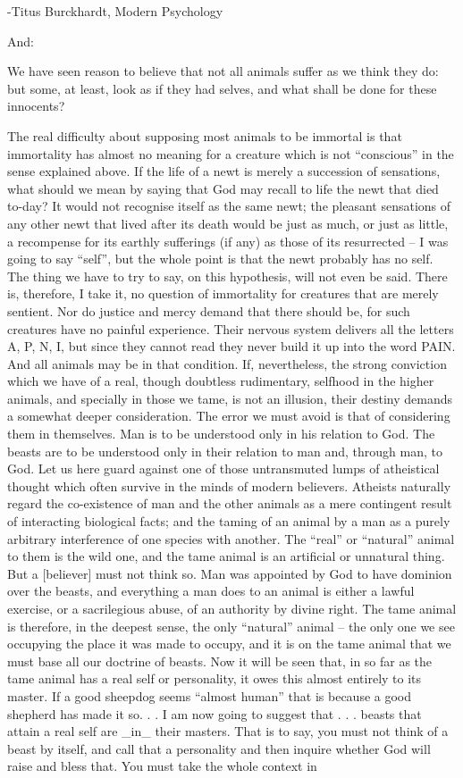 \begin{footnotesize}
\begin{sffamily}
{}-Titus Burckhardt, Modern Psychology

And:

We have seen reason to believe that not all animals suffer as we think they do: but some, at least, look as if they had selves, and what shall be done for these innocents? 

The real difficulty about supposing most animals to be immortal is that immortality has almost no meaning for a creature which is not “conscious” in the sense explained above. If the life of a newt is merely a succession of sensations, what should we mean by saying that God may recall to life the newt that died to-day? It would not recognise itself as the same newt; the pleasant sensations of any other newt that lived after its death would be just as much, or just as little, a recompense for its earthly sufferings (if any) as those of its resurrected – I was going to say “self”, but the whole point is that the newt probably has no self. The thing we have to try to say, on this hypothesis, will not even be said. There is, therefore, I take it, no question of immortality for creatures that are merely sentient. Nor do justice and mercy demand that there should be, for such creatures have no painful experience. Their nervous system delivers all the letters A, P, N, I, but since they cannot read they never build it up into the word PAIN. And all animals may be in that condition. If, nevertheless, the strong conviction which we have of a real, though doubtless rudimentary, selfhood in the higher animals, and specially in those we tame, is not an illusion, their destiny demands a somewhat deeper consideration. The error we must avoid is that of considering them in themselves. Man is to be understood only in his relation to God. The beasts are to be understood only in their relation to man and, through man, to God. Let us here guard against one of those untransmuted lumps of atheistical thought which often survive in the minds of modern believers. Atheists naturally regard the co-existence of man and the other animals as a mere contingent result of interacting biological facts; and the taming of an animal by a man as a purely arbitrary interference of one species with another. The “real” or “natural” animal to them is the wild one, and the tame animal is an artificial or unnatural thing. But a [believer] must not think so. Man was appointed by God to have dominion over the beasts, and everything a man does to an animal is either a lawful exercise, or a sacrilegious abuse, of an authority by divine right. The tame animal is therefore, in the deepest sense, the only “natural” animal – the only one we see occupying the place it was made to occupy, and it is on the tame animal that we must base all our doctrine of beasts. Now it will be seen that, in so far as the tame animal has a real self or personality, it owes this almost entirely to its master. If a good sheepdog seems “almost human” that is because a good shepherd has made it so. . . I am now going to suggest that . . . beasts that attain a real self are \_in\_ their masters. That is to say, you must not think of a beast by itself, and call that a personality and then inquire whether God will raise and bless that. You must take the whole context in 
\end{sffamily}
\end{footnotesize}
